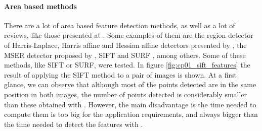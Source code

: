 \paragraph{Area based methods}\label{ch:chapter01_01_02_01_02}

There are a lot of area based feature detection methods, as well as a lot of reviews, like those presented at \cite{mikolajczyk2005comparison, li2008comprehensive}. Some examples of them are the region detector of Harris-Laplace, Harris affine and Hessian affine detectors presented by \cite{mikolajczyk2004scale}, the MSER detector proposed by \cite{matas2004robust}, SIFT \citep{lowe1999object} and SURF \citep{bay2008speeded}, among others. Some of these methods, like SIFT or SURF, were tested. In figure \ref{fig:cp01_sift_features} the result of applying the SIFT method to a pair of images is shown. At a first glance, we can observe that although most of the points detected are in the same position in both images, the number of points detected is considerably smaller than these obtained with \cite{shi1994good}. However, the main disadvantage is the time needed to compute them is too big for the application requirements, and always bigger than the time needed to detect the features with \cite{shi1994good}.

